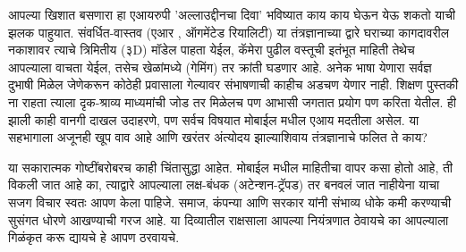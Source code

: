आपल्या खिशात बसणारा हा एआयरुपी 'अल्लाउद्दीनचा दिवा' भविष्यात काय काय घेऊन येऊ शकतो याची झलक पाहुयात. संवर्धित-वास्तव (एआर , ऑगमेंटेड रियालिटी) या तंत्रज्ञानाच्या द्वारे घराच्या कागदावरील नकाशावर त्याचे त्रिमितीय (३D) मॉडेल पाहता येईल, कॅमेरा पुढील वस्तूची इतंभूत माहिती तेथेच आपल्याला वाचता येईल, तसेच खेळांमध्ये (गेमिंग) तर क्रांती घडणार आहे. अनेक भाषा येणारा सर्वज्ञ दुभाषी मिळेल जेणेकरून कोठेही प्रवासाला गेल्यावर संभाषणाची काहीच अडचण येणार नाही. शिक्षण पुस्तकी ना राहता त्याला दृक-श्राव्य माध्यमांची जोड तर मिळेलच पण आभासी जगतात प्रयोग पण करिता येतील. ही झाली काही वानगी दाखल उदाहरणे, पण सर्वच विषयात मोबाईल मधील एआय मदतीला असेल. या सहभागाला अजूनही खूप वाव आहे आणि खरंतर अंत्योदय झाल्याशिवाय तंत्रज्ञानाचे फलित ते काय?

या सकारात्मक गोष्टींबरोबरच काही चिंतासुद्धा आहेत. मोबाईल मधील माहितीचा वापर कसा होतो आहे, ती विकली जात आहे का, त्याद्वारे आपल्याला लक्ष-बंधक (अटेन्शन-ट्रॅपड) तर बनवलं जात नाहीयेना याचा सजग विचार स्वतः आपण केला पाहिजे. समाज, कंपन्या आणि सरकार यांनी संभाव्य धोके कमी करण्याची सुसंगत धोरणे आखण्याची गरज आहे. या दिव्यातील राक्षसाला आपल्या नियंत्रणात ठेवायचे का आपल्याला गिळंकृत करू द्यायचे हे आपण ठरवायचे.